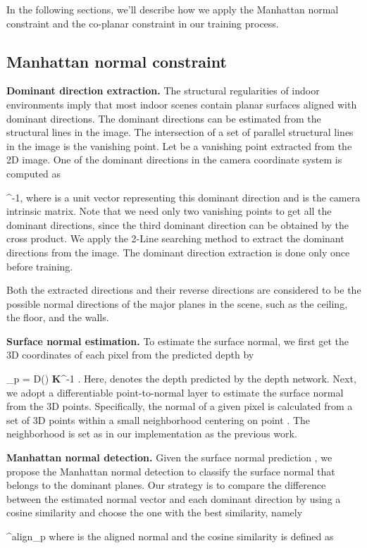 \documentclass[10pt,twocolumn,letterpaper]{article}
\newcommand{\bv}[1]{{\bm {#1}}}
\newcommand{\ba}[1]{{\bf {#1}}}
\newcommand{\beq}{}
\begin{document}
In the following sections, we'll describe how we apply the Manhattan normal constraint and the co-planar constraint in our training process.

\subsection{Manhattan normal constraint}

\textbf{Dominant direction extraction.}
The structural regularities of indoor environments imply that most indoor scenes contain planar surfaces aligned with dominant directions. The dominant directions can be estimated from the structural lines in the image. The intersection of a set of parallel structural lines in the image is the vanishing point. Let  be a vanishing point extracted from the 2D image. One of the dominant directions in the camera coordinate system is computed as
\beq
\bv{\eta} \propto \ba{K}^{-1}\bv{v},
\eeq 
where  is a unit vector representing this dominant direction and  is the camera intrinsic matrix. Note that we need only two vanishing points to get all the dominant directions, since the third dominant direction can be obtained by the cross product. We apply the 2-Line searching method \cite{lu20172} to extract the dominant directions from the image. The dominant direction extraction is done only once before training.

Both the extracted directions and their reverse directions are considered to be the possible normal directions of the major planes in the scene, such as the ceiling, the floor, and the walls.


\textbf{Surface normal estimation.}
To estimate the surface normal, we first get the 3D coordinates  of each pixel  from the predicted depth by
\beq
\bv{X}_p = D(\bv{p}) \ba{K}^{-1} \bv{p}.
\eeq
Here,  denotes the depth predicted by the depth network. Next, we adopt a differentiable point-to-normal layer\cite{yang2018lego,yang2018unsupervised,kaneko2019tridepth} to estimate the surface normal from the 3D points.
Specifically, the normal  of a given pixel  is calculated from a set of 3D points within a small neighborhood centering on point .  The neighborhood is set as  in our implementation as the previous work\cite{yang2018lego}.

\textbf{Manhattan normal detection.}
Given the surface normal prediction , we propose the Manhattan normal detection to classify the surface normal that belongs to the dominant planes. Our strategy is to compare the difference between the estimated normal vector   and each dominant direction  by using a cosine similarity   and choose the one with the best similarity, namely
\beq
\bv{n}^{align}_{p} \leftarrow{ 
	\mathop{\arg\max}\limits_{\bv{\eta}^k}
	s({\bv{n}}_{p}, \bv{\eta}^k)
}
\label{eq:aligned_norm}
\eeq
where  is the aligned normal and the cosine similarity is defined as
\end{document}
